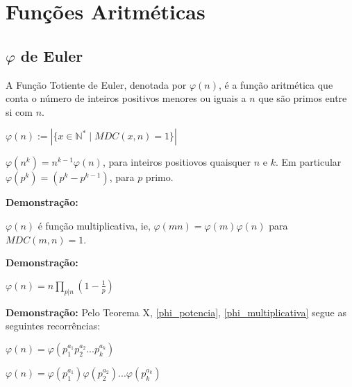 
\chapter{Funções Aritméticas} %

\label{Chapter3} %


\section{$\varphi$ de Euler}

\begin{definition}
A Função Totiente de Euler, denotada por $\varphi(n)$, é a função aritmética que conta o número 
de inteiros positivos menores ou iguais a $n$ que são primos entre si com $n$.

$\varphi(n) := |\{ x \in \mathbb{N}^{*} \mid MDC(x,n) = 1 \}|$
\end{definition}


\begin{theorem}\label{phi_potencia}
$\varphi(n^k) = n^{k-1}\varphi(n)$, para inteiros positiovos quaisquer $n$ e $k$. Em particular 
$\varphi(p^k) = (p^k - p^{k-1})$, para $p$ primo.%
\end{theorem}
\textbf{Demonstração:}



\begin{theorem}\label{phi_multiplicativa}
$\varphi(n)$ é função multiplicativa, ie, $\varphi(mn) = \varphi(m)\varphi(n)$ para $MDC(m,n) = 1$.
\end{theorem}
\textbf{Demonstração:}



\begin{theorem}
$\varphi(n) = n \prod_{p|n}(1 - \frac{1}{p})$
\end{theorem}
\textbf{Demonstração:}
Pelo Teorema X, \autoref{phi_potencia}, \autoref{phi_multiplicativa} segue as seguintes recorrências:

$\varphi(n) = \varphi(p_1^{a_1}p_2^{a_2}...p_k^{a_k})$

$\varphi(n) = \varphi(p_1^{a_1})\varphi(p_2^{a_2})...\varphi(p_k^{a_k})$

